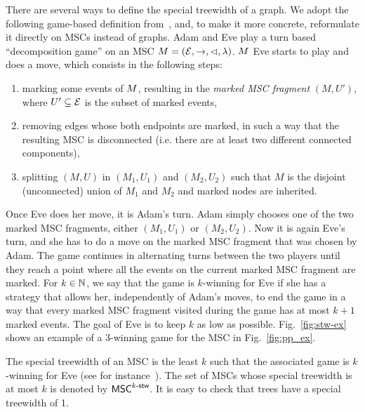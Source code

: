 There are several ways to define the special treewidth of a graph.
We adopt the following game-based definition from~\cite{DBLP:journals/corr/abs-1904-06942},
and, to make it more concrete, reformulate it directly on MSCs instead of graphs.
Adam and Eve play a turn based ``decomposition game'' on an MSC $M = (\mathcal{E}, \to, \lhd, \lambda)$. $M$
Eve starts to play and does a move, which consists in the following steps:
\begin{enumerate}
	\item marking some events of $M$, resulting in the \emph{marked MSC fragment} $(M, U')$, where $U' \subseteq \mathcal{E}$ is the subset of marked events,
	\item removing edges whose both endpoints are marked, in such a way that the resulting MSC is disconnected (i.e. there are at least two different connected components),
	\item splitting $(M, U)$ in $(M_1, U_1)$ and $(M_2, U_2)$ such that $M$ is the disjoint (unconnected) union of $M_1$ and $M_2$
	and marked nodes are inherited.
\end{enumerate}
Once Eve does her move, it is Adam's turn. Adam simply chooses one of the two marked MSC fragments, either $(M_1, U_1)$ or $(M_2, U_2)$. Now it is again Eve's turn, and she has to do a move on the marked MSC fragment that was chosen by Adam. The game continues in alternating turns between the two players until they reach a point where all the events on the current marked MSC fragment are marked.
For $k \in \mathbb{N}$, we say that the game is $k$-winning for Eve if she has a strategy that allows her, independently of Adam's moves, to end the game in a way that every marked MSC fragment visited during the game has at most $k+1$ marked events. The goal of Eve is to keep $k$ as low as possible. Fig.~\ref{fig:stw-ex} shows an example of a 3-winning game for the MSC in Fig.~\ref{fig:pp_ex}.

The special treewidth of an MSC is the least $k$ such that
the associated game is $k$-winning for Eve
(see for instance~\cite{DBLP:journals/corr/abs-1904-06942}).
The set of MSCs whose special treewidth is at most $k$ is denoted by $\mathsf{MSC}^{k\textup{-}\mathsf{stw}}$. It is easy to check that trees have a special treewidth of 1.

